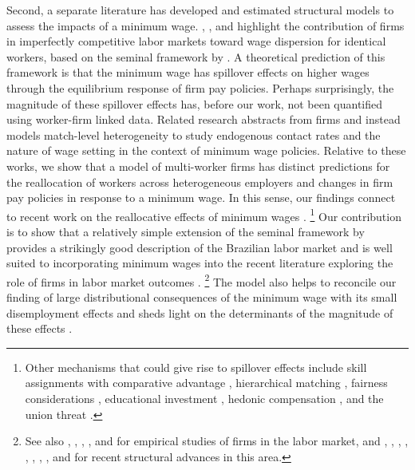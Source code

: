 Second, a separate literature has developed and estimated structural models to assess the impacts of a minimum wage. , \citet{Bontemps1999,Bontemps2000}, and \citet{Manning2003} highlight the contribution of firms in imperfectly competitive labor markets toward wage dispersion for identical workers, based on the seminal framework by \citet{BurdettMortensen1998}. A theoretical prediction of this framework is that the minimum wage has spillover effects on higher wages through the equilibrium response of firm pay policies. Perhaps surprisingly, the magnitude of these spillover effects has, before our work, not been quantified using worker-firm linked data. Related research abstracts from firms and instead models match-level heterogeneity to study endogenous contact rates \citep{Flinn2006} and the nature of wage setting \citep{FlinnMullins2018} in the context of minimum wage policies. Relative to these works, we show that a model of multi-worker firms has distinct predictions for the reallocation of workers across heterogeneous employers and changes in firm pay policies in response to a minimum wage. In this sense, our findings connect to recent work on the reallocative effects of minimum wages \citep{AaronsonFrenchSorkinTo2018, BergerHerkenhoffMongey2019, BergerHerkenhoffMongey2021, HarasztosiLindner2019, DustmannLindnerSchonbergUmkehrervomBerge2020, ClemensKahnMeer2021}.%
%
\footnote{Other mechanisms that could give rise to spillover effects include skill assignments with comparative advantage \citep{Teulings1995a}, hierarchical matching \citep{LopesdeMelo2012}, fairness considerations \citep{Card2012a}, educational investment \citep{Barany2016a}, hedonic compensation \citep{Phelan2018}, and the union threat \citep{TaschereauDumouchel2020}.} %
%
Our contribution is to show that a relatively simple extension of the seminal framework by \citet{BurdettMortensen1998} provides a strikingly good description of the Brazilian labor market and is well suited to incorporating minimum wages into the recent literature exploring the role of firms in labor market outcomes \citep{Clemens2021}.%
%
\footnote{See also \citet{Davis1991}, \citet{abowdkramarzmargolis1999}, \citet{Card2013c}, \citet{Barth2016a}, and \citet{SongPriceGuvenenBloomvonWachter2018} for empirical studies of firms in the labor market, and \citet{Postel-Vinay2002}, \citet{DeyFlinn2005}, \citet{Cahuc2006}, \citet{LiseRobin2017}, \citet{bilaletal2019}, \citet{elsbygottfries2019}, \citet{gouinbonenfant2020}, \citet{BilalLhuillier2020}, and \citet{Jarosch2021} for recent structural advances in this area.} %
%
The model also helps to reconcile our finding of large distributional consequences of the minimum wage with its small disemployment effects \citep{Teulings2000} and sheds light on the determinants of the magnitude of these effects \citep{Neumark2017}.%

